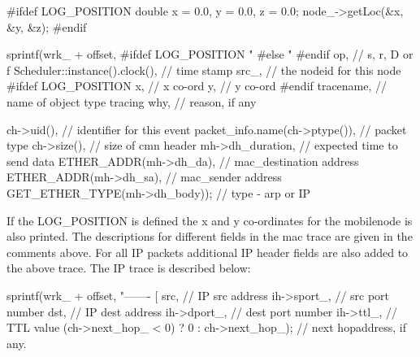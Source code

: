 \begin{program}
\#ifdef LOG_POSITION
        double x = 0.0, y = 0.0, z = 0.0;
        node_->getLoc(&x, &y, &z);
\#endif

        sprintf(wrk_ + offset,
\#ifdef LOG_POSITION
                "%
\#else
                "%
\#endif
                op,                    // s, r, D or f
                Scheduler::instance().clock(),  // time stamp
                src_,                  // the nodeid for this node
\#ifdef LOG_POSITION
                x,                     // x co-ord 
                y,                     // y co-ord
\#endif
                tracename,             // name of object type tracing
                why,                   // reason, if any

                ch->uid(),             // identifier for this event
                packet_info.name(ch->ptype()), // packet type
                ch->size(),                    // size of cmn header
                mh->dh_duration,       // expected time to send data 
                ETHER_ADDR(mh->dh_da), // mac_destination address
                ETHER_ADDR(mh->dh_sa),         // mac_sender address
                GET_ETHER_TYPE(mh->dh_body));  // type - arp or IP
\end{program}

If the LOG\_POSITION is defined the x and y co-ordinates for the
mobilenode is also printed. The descriptions for different fields in the
mac trace are given in the comments above. For all IP packets additional
IP header fields are also added to the above trace. The IP trace is
described below:

\begin{program}
sprintf(wrk_ + offset, "------- [%
                src,          // IP src address
                ih->sport_,   // src port number
                dst,          // IP dest address
                ih->dport_,   // dest port number
                ih->ttl_,     // TTL value 
                (ch->next_hop_ < 0) ? 0 : ch->next_hop_); // next hopaddress, if any.
\end{program}

